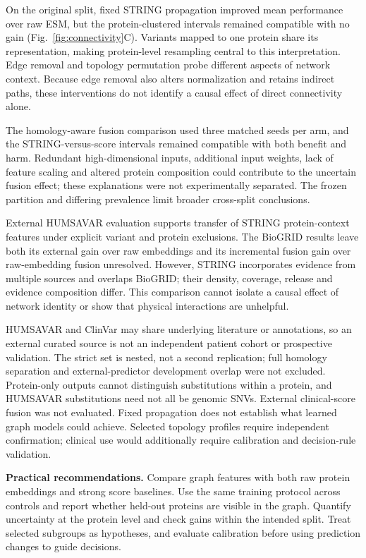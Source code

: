\documentclass[conference]{IEEEtran}
\begin{document}
On the original split, fixed STRING propagation improved mean performance over raw ESM, but the protein-clustered intervals remained compatible with no gain (Fig.~\ref{fig:connectivity}C). Variants mapped to one protein share its representation, making protein-level resampling central to this interpretation. Edge removal and topology permutation probe different aspects of network context. Because edge removal also alters normalization and retains indirect paths, these interventions do not identify a causal effect of direct connectivity alone.

The homology-aware fusion comparison used three matched seeds per arm, and the STRING-versus-score intervals remained compatible with both benefit and harm. Redundant high-dimensional inputs, additional input weights, lack of feature scaling and altered protein composition could contribute to the uncertain fusion effect; these explanations were not experimentally separated. The frozen partition and differing prevalence limit broader cross-split conclusions.

External HUMSAVAR evaluation supports transfer of STRING protein-context features under explicit variant and protein exclusions. The BioGRID results leave both its external gain over raw embeddings and its incremental fusion gain over raw-embedding fusion unresolved. However, STRING incorporates evidence from multiple sources and overlaps BioGRID; their density, coverage, release and evidence composition differ. This comparison cannot isolate a causal effect of network identity or show that physical interactions are unhelpful.

HUMSAVAR and ClinVar may share underlying literature or annotations, so an external curated source is not an independent patient cohort or prospective validation. The strict set is nested, not a second replication; full homology separation and external-predictor development overlap were not excluded. Protein-only outputs cannot distinguish substitutions within a protein, and HUMSAVAR substitutions need not all be genomic SNVs. External clinical-score fusion was not evaluated. Fixed propagation does not establish what learned graph models could achieve. Selected topology profiles require independent confirmation; clinical use would additionally require calibration and decision-rule validation.

\noindent\textbf{Practical recommendations.}
Compare graph features with both raw protein embeddings and strong score baselines. Use the same training protocol across controls and report whether held-out proteins are visible in the graph. Quantify uncertainty at the protein level and check gains within the intended split. Treat selected subgroups as hypotheses, and evaluate calibration before using prediction changes to guide decisions.
\end{document}
